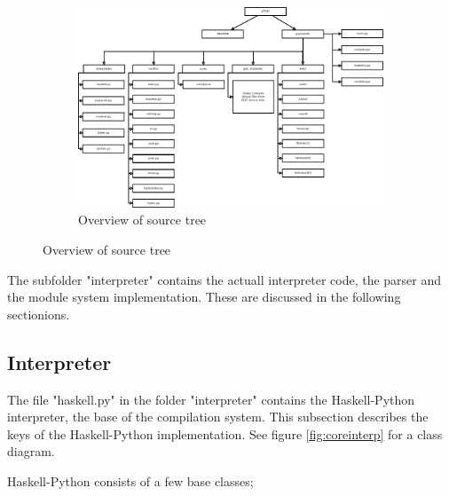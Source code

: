 \begin{figure}
\begin{figure}[H]
\centering
\includegraphics[width=\textheight]{../diags/overview.pdf}

\caption{Overview of source tree}
\label{fig:overview}

\end{figure}
\end{figure}

The subfolder "interpreter" contains the actuall 
interpreter code, the parser and the module system implementation. These are
discussed in the following sectionions.

\subsection*{Interpreter}

The file "haskell.py" in the folder "interpreter" contains the
Haskell-Python interpreter, the base of the compilation system.
This subsection describes the keys of the Haskell-Python implementation.
See figure \ref{fig:coreinterp} for a class diagram.

Haskell-Python consists of a few base classes; 

